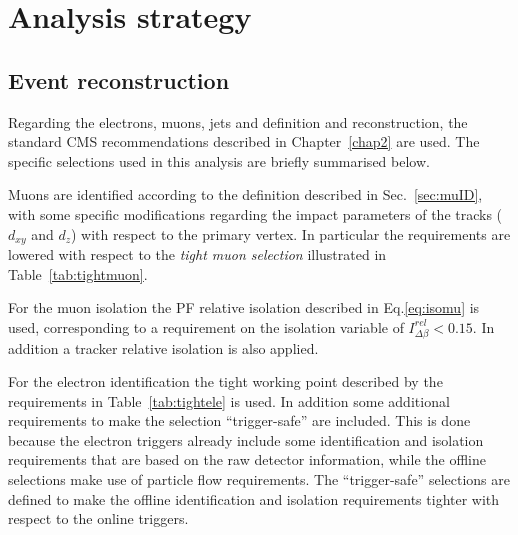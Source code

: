 \section{Analysis strategy}\label{chap5:analysis_strategy}

\subsection{Event reconstruction}

Regarding the electrons, muons, jets and \MET definition and reconstruction, the standard CMS recommendations described in Chapter~\ref{chap2} are used. The specific selections used in this analysis are briefly summarised below.

Muons are identified according to the definition described in Sec.~\ref{sec:muID}, with some specific modifications regarding the impact parameters of the tracks ($d_{xy}$ and $d_z$) with respect to the primary vertex. In particular the requirements are lowered with respect to the \emph{tight muon selection} illustrated in Table~\ref{tab:tightmuon}.


For the muon isolation the PF relative isolation described in Eq.\eqref{eq:isomu} is used, corresponding to a requirement on the isolation variable of $I^{rel}_{\Delta\beta} < 0.15$. In addition a tracker relative isolation is also applied.

For the electron identification the tight working point described by the requirements in Table~\ref{tab:tightele} is used. In addition some additional requirements to make the selection ``trigger-safe'' are included. This is done because the electron triggers already include some identification and isolation requirements that are based on the raw detector information, while the offline selections make use of particle flow requirements. The ``trigger-safe'' selections are defined to make the offline identification and isolation requirements tighter with respect to the online triggers.

